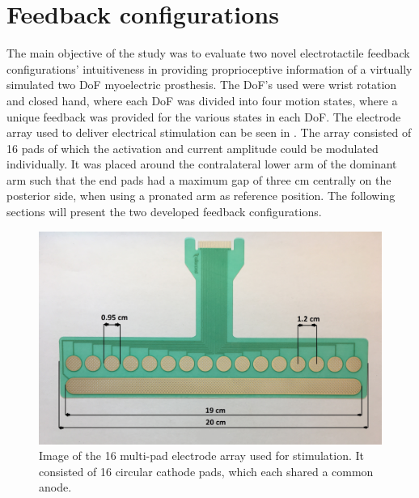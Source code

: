 \section{Feedback configurations}
The main objective of the study was to evaluate two novel electrotactile feedback configurations' intuitiveness in providing proprioceptive information of a virtually simulated two DoF myoelectric prosthesis. The DoF's used were wrist rotation and closed hand, where each DoF was divided into four motion states, where a unique feedback was provided for the various states in each DoF. The electrode array used to deliver electrical stimulation can be seen in . The array consisted of 16 pads of which the activation and current amplitude could be modulated individually. It was placed around the contralateral lower arm of the dominant arm such that the end pads had a maximum gap of three cm centrally on the posterior side, when using a pronated arm as reference position. The following sections will present the two developed feedback configurations. 

\begin{figure}[H]                 
	\includegraphics[width=.57\textwidth]{figures/electrode}  
	\caption{Image of the 16 multi-pad electrode array used for stimulation. It consisted of 16 circular cathode pads, which each shared a common anode.}
	\label{fig:pa:electrode} 
\end{figure}

